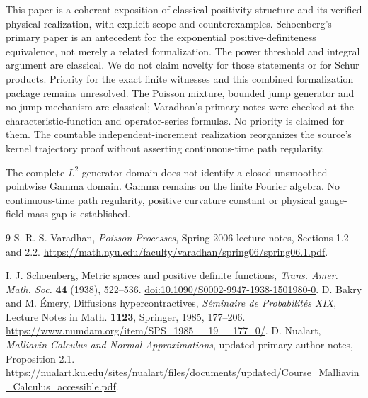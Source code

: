 \documentclass[11pt]{article}
\theoremstyle{remark}\newtheorem{remark}[theorem]{Remark}
\begin{document}
This paper is a coherent exposition of classical positivity
structure and its verified physical realization, with explicit
scope and counterexamples. Schoenberg's primary paper
\cite{schoenberg} is an antecedent for the exponential
positive-definiteness equivalence, not merely a related
formalization. The power threshold and integral argument are
classical. We do not claim novelty for those statements or for
Schur products. Priority for the exact finite witnesses and
this combined formalization package remains unresolved. The Poisson mixture, bounded jump generator and no-jump mechanism are classical; Varadhan's primary notes were checked at the characteristic-function and operator-series formulas. No priority is claimed for them. The countable independent-increment realization reorganizes the source's kernel trajectory proof without asserting continuous-time path regularity.

The complete $L^2$ generator domain does not identify a closed
unsmoothed pointwise Gamma domain. Gamma remains on the finite Fourier
algebra. No continuous-time path regularity, positive curvature
constant or physical gauge-field mass gap is established.

\begin{thebibliography}{9}
 S. R. S. Varadhan,
\emph{Poisson Processes}, Spring 2006 lecture notes, Sections 1.2 and 2.2.
\url{https://math.nyu.edu/faculty/varadhan/spring06/spring06.1.pdf}.

 I. J. Schoenberg,
Metric spaces and positive definite functions,
\emph{Trans. Amer. Math. Soc.} \textbf{44} (1938), 522--536.
\href{https://doi.org/10.1090/S0002-9947-1938-1501980-0}
{doi:10.1090/S0002-9947-1938-1501980-0}.
 D. Bakry and M. \'Emery,
Diffusions hypercontractives,
\emph{S\'eminaire de Probabilit\'es XIX},
Lecture Notes in Math. \textbf{1123}, Springer, 1985, 177--206.
\url{https://www.numdam.org/item/SPS_1985__19__177_0/}.
 D. Nualart, \emph{Malliavin Calculus and Normal Approximations},
updated primary author notes, Proposition 2.1.
\url{https://nualart.ku.edu/sites/nualart/files/documents/updated/Course_Malliavin_Calculus_accessible.pdf}.
\end{thebibliography}
\end{document}
